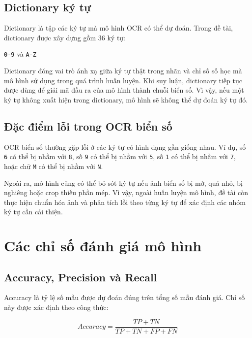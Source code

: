 \documentclass[13pt,a4paper]{report}
\begin{document}
\subsection{Dictionary ký tự}

Dictionary là tập các ký tự mà mô hình OCR có thể dự đoán. Trong đề tài, dictionary được xây dựng gồm 36 ký tự:

\begin{center}
	\texttt{0-9} và \texttt{A-Z}
\end{center}

Dictionary đóng vai trò ánh xạ giữa ký tự thật trong nhãn và chỉ số số học mà mô hình sử dụng trong quá trình huấn luyện. Khi suy luận, dictionary tiếp tục được dùng để giải mã đầu ra của mô hình thành chuỗi biển số. Vì vậy, nếu một ký tự không xuất hiện trong dictionary, mô hình sẽ không thể dự đoán ký tự đó.
\subsection{Đặc điểm lỗi trong OCR biển số}

OCR biển số thường gặp lỗi ở các ký tự có hình dạng gần giống nhau. Ví dụ, số \texttt{6} có thể bị nhầm với \texttt{8}, số \texttt{9} có thể bị nhầm với \texttt{5}, số \texttt{1} có thể bị nhầm với \texttt{7}, hoặc chữ \texttt{M} có thể bị nhầm với \texttt{N}.

Ngoài ra, mô hình cũng có thể bỏ sót ký tự nếu ảnh biển số bị mờ, quá nhỏ, bị nghiêng hoặc crop thiếu phần mép. Vì vậy, ngoài huấn luyện mô hình, đề tài còn thực hiện chuẩn hóa ảnh và phân tích lỗi theo từng ký tự để xác định các nhóm ký tự cần cải thiện.




\section{Các chỉ số đánh giá mô hình}

\subsection{Accuracy, Precision và Recall}

Accuracy là tỷ lệ số mẫu được dự đoán đúng trên tổng số mẫu đánh giá. Chỉ số này được xác định theo công thức:

\begin{equation}
	Accuracy = \frac{TP + TN}{TP + TN + FP + FN}
\end{equation}
\end{document}
